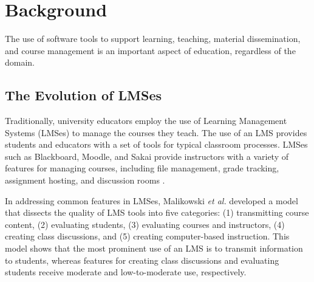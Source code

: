 



\section{Background}
The use of software tools to support learning, teaching, material dissemination, and course management is an important aspect of education, regardless of the domain.

\subsection{The Evolution of LMSes}
Traditionally, university educators employ the use of Learning Management Systems (LMSes) to manage the courses they teach. The use of an LMS provides students and educators with a set of tools for typical classroom processes. LMSes such as Blackboard, Moodle, and Sakai provide instructors with a variety of features for managing courses, including file management, grade tracking, assignment hosting, and discussion rooms \cite{kumar2011comparative}.

In addressing common features in LMSes, Malikowski \emph{et al.} \cite{malikowski2007model} developed a model that dissects the quality of LMS tools into five categories: (1) transmitting course content, (2) evaluating students, (3) evaluating courses and instructors, (4) creating class discussions, and (5) creating computer-based instruction. This model shows that the most prominent use of an LMS is to transmit information to students, whereas features for creating class discussions and evaluating students receive moderate and low-to-moderate use, respectively.%

